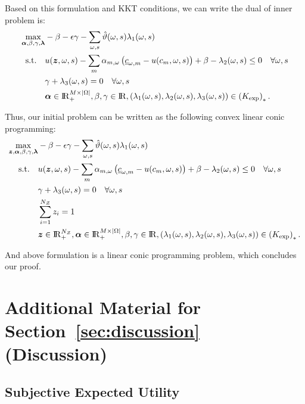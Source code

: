 \documentclass[11pt,oneside]{article}
\theoremstyle{plain}
\theoremstyle{plain}
\theoremstyle{plain}
\theoremstyle{plain}
\theoremstyle{plain}
\theoremstyle{definition}
\theoremstyle{definition}
\theoremstyle{remark}
\theoremstyle{plain}
\newcommand{\R}{{\rm I\!R}}
\renewcommand{\Re}{\R}
\renewcommand{\Re}{\R}
\begin{document}
Based on this formulation and KKT conditions, we can write the dual of inner problem is:
\begin{align*}
\max_{\boldsymbol{\alpha},\beta,\gamma, \boldsymbol{\lambda}} & -\beta - \epsilon \gamma - \sum_{\omega,s} \hat{\vartheta}(\omega,s)\lambda_1(\omega,s)\\
\text{s.t.} \quad &u(\boldsymbol{z},\omega,s) - \sum_m \alpha_{m,\omega} \left( \underline{c}_{\omega,m} - u(c_m,\omega,s)\right) + \beta - \lambda_2(\omega,s) \leq 0 \quad \forall \omega,s\\
& \gamma + \lambda_3(\omega,s) = 0 \quad \forall \omega,s\\
& \boldsymbol{\alpha} \in \R_+^{M\times |\Omega|}, \beta , \gamma \in \Re, (\lambda_1(\omega,s), \lambda_2(\omega,s),\lambda_3(\omega,s))\in \left(K_{\text{exp}}\right)_*.
\end{align*}

Thus, our initial problem can be written as the following convex linear conic programming:
\begin{align*}
    \max_{\boldsymbol{z},\boldsymbol{\alpha},\beta,\gamma, \boldsymbol{\lambda}} & -\beta - \epsilon \gamma - \sum_{\omega,s} \hat{\vartheta}(\omega,s)\lambda_1(\omega,s)\\
\text{s.t.} \quad &u(\boldsymbol{z},\omega,s) - \sum_m \alpha_{m,\omega} \left( \underline{c}_{\omega,m} - u(c_m,\omega,s)\right) + \beta - \lambda_2(\omega,s) \leq 0 \quad \forall \omega,s\\
& \gamma + \lambda_3(\omega,s) = 0 \quad \forall \omega,s\\
&\sum_{i=1}^{N_\mathcal{Z}} z_i = 1\\
& \boldsymbol{z}\in \R^{N_\mathcal{Z}}_+,\boldsymbol{\alpha} \in \R_+^{M\times |\Omega|}, \beta , \gamma \in \Re, (\lambda_1(\omega,s), \lambda_2(\omega,s),\lambda_3(\omega,s))\in \left(K_{\text{exp}}\right)_*.
\end{align*}

And above formulation is a linear conic programming problem, which concludes our proof.

\section{Additional Material for Section~\ref{sec:discussion} (Discussion)}
\label{sec:appendix_discussion}


\subsection{Subjective Expected Utility}
\end{document}
